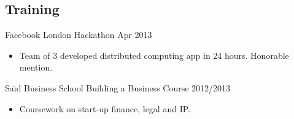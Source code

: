 \documentclass[margin]{res}
\newcommand{\locdatesubsection}[3]{\textbf{#1} (#2) \hfill #3}
\newcommand{\nbdatesubsection}[2]{#1 \hfill #2 }
\begin{document}
\begin{sloppypar}
\begin{resume}
%


\section{Training}

\nbdatesubsection{Facebook London Hackathon}{Apr 2013}
    \begin{itemize}
        \item Team of 3 developed distributed computing app in 24 hours. Honorable mention.
    \end{itemize}


\nbdatesubsection{Sa\"\i d Business School Building a Business Course}{2012/2013}
    \begin{itemize}
            \item Coursework on start-up finance, legal and IP.
    \end{itemize}


\end{resume}
\end{sloppypar}
\end{document}
